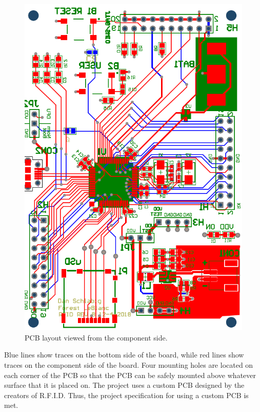 \begin{figure}[H]
    \centering
    \includegraphics[scale=0.7,angle=90]{Figures/5_results/pcb_printout_3_1,2019_roughdraft.PNG} 
    \caption{PCB layout viewed from the component side.}
    \label{fig:pcb}
\end{figure}

Blue lines show traces on the bottom side of the board, while red lines show traces on the component side of the board. Four mounting holes are located on each corner of the PCB so that the PCB can be safely mounted above whatever surface that it is placed on. The project uses a custom PCB designed by the creators of R.F.I.D. Thus, the project specification for using a custom PCB is met.